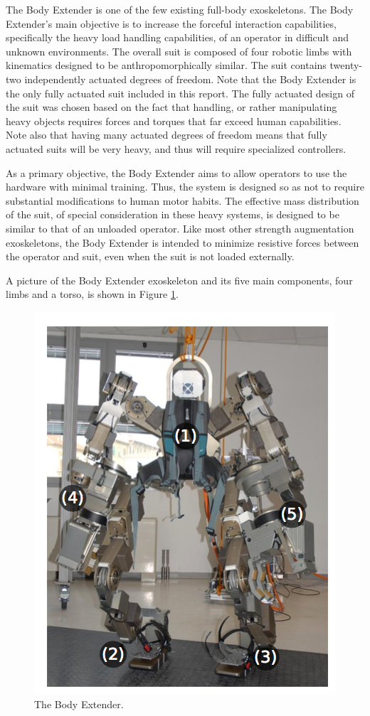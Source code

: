 \begin{refsection}

The Body Extender is one of the few existing full-body exoskeletons.  The Body Extender's main objective is to increase the forceful interaction capabilities, specifically the heavy load handling capabilities, of an operator in difficult and unknown environments.  The overall suit is composed of four robotic limbs with kinematics designed to be anthropomorphically similar.  The suit contains twenty-two independently actuated degrees of freedom.  Note that the Body Extender is the only fully actuated suit included in this report.  The fully actuated design of the suit was chosen based on the fact that handling, or rather manipulating heavy objects requires forces and torques that far exceed human capabilities.  Note also that having many actuated degrees of freedom means that fully actuated suits will be very heavy, and thus will require specialized controllers.

As a primary objective, the Body Extender aims to allow operators to use the hardware with minimal training.  Thus, the system is designed so as not to require substantial modifications to human motor habits.  The effective mass distribution of the suit, of special consideration in these heavy systems, is designed to be similar to that of an unloaded operator.  Like most other strength augmentation exoskeletons, the Body Extender is intended to minimize resistive forces between the operator and suit, even when the suit is not loaded externally. 

A picture of the Body Extender exoskeleton and its five main components, four limbs and a torso, is shown in Figure \ref{fig:bodyExt}.
\begin{figure}[thpb]
\centering
\includegraphics[width=3.in]{exos/figs/bodyExt/bodyExt}
  \caption{The Body Extender.}
 \label{fig:bodyExt}   
 \end{figure}
 


\end{refsection}
